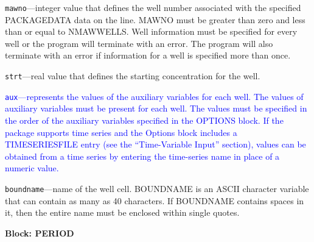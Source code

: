 \begin{description}
\item \texttt{mawno}---integer value that defines the well number associated with the specified PACKAGEDATA data on the line. MAWNO must be greater than zero and less than or equal to NMAWWELLS. Well information must be specified for every well or the program will terminate with an error.  The program will also terminate with an error if information for a well is specified more than once.

\item \texttt{strt}---real value that defines the starting concentration for the well.

\item \textcolor{blue}{\texttt{aux}---represents the values of the auxiliary variables for each well. The values of auxiliary variables must be present for each well. The values must be specified in the order of the auxiliary variables specified in the OPTIONS block.  If the package supports time series and the Options block includes a TIMESERIESFILE entry (see the ``Time-Variable Input'' section), values can be obtained from a time series by entering the time-series name in place of a numeric value.}

\item \texttt{boundname}---name of the well cell.  BOUNDNAME is an ASCII character variable that can contain as many as 40 characters.  If BOUNDNAME contains spaces in it, then the entire name must be enclosed within single quotes.

\end{description}
\item \textbf{Block: PERIOD}

